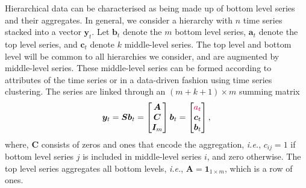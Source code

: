 \documentclass[a4paper,review,12pt,authoryear]{elsarticle}
\begin{document}
Hierarchical data can be characterised as being made up of bottom level series and their aggregates. In general, we consider a hierarchy with $n$ time series stacked into a vector $\boldsymbol{y}_t$. Let $\boldsymbol{b}_t$ denote the $m$ bottom level series, $\boldsymbol{a}_t$ denote the top level series, and $\boldsymbol{c}_t$ denote $k$ middle-level series. The top level and bottom level will be common to all hierarchies we consider, and are augmented by middle-level series. These middle-level series can be formed according to attributes of the time series or in a data-driven fashion using time series clustering. The series are linked through an $(m+k+1)\times m$ summing matrix 
\[
  \boldsymbol{y}_t = \boldsymbol{S}\boldsymbol{b}_t = \begin{bmatrix}
    \boldsymbol{A} \\\boldsymbol{C} \\ \boldsymbol{I}_m 
  \end{bmatrix}  \boldsymbol{b}_t = \begin{bmatrix}
      {\color{purple}a_t} \\ \boldsymbol{c}_t \\\boldsymbol{b}_t
  \end{bmatrix},
\]
where, $\boldsymbol{C}$ consists of zeros and ones that encode the aggregation, \textit{i.e.}, $c_{ij}=1$ if bottom level series $j$ is included in middle-level series $i$, and zero otherwise. The top level series aggregates all bottom levels, \textit{i.e.}, $\boldsymbol{A} = \mathbf{1}_{1\times m}$, which is a row of ones.



\end{document}
